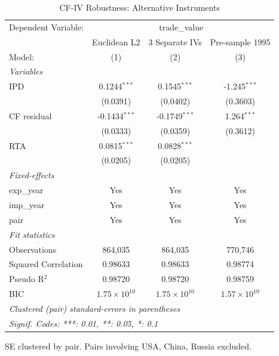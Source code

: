 
\begin{table}[htbp]
   \caption{CF-IV Robustness: Alternative Instruments}
   \centering
   \begin{tabular}{lccc}
      \tabularnewline \midrule \midrule
      Dependent Variable: & \multicolumn{3}{c}{trade\_value}\\
                          & Euclidean L2          & 3 Separate IVs        & Pre-sample 1995 \\   
      Model:              & (1)                   & (2)                   & (3)\\  
      \midrule
      \emph{Variables}\\
      IPD                 & 0.1244$^{***}$        & 0.1545$^{***}$        & -1.245$^{***}$\\   
                          & (0.0391)              & (0.0402)              & (0.3603)\\   
      CF residual         & -0.1434$^{***}$       & -0.1749$^{***}$       & 1.264$^{***}$\\   
                          & (0.0333)              & (0.0359)              & (0.3612)\\   
      RTA                 & 0.0815$^{***}$        & 0.0828$^{***}$        &   \\   
                          & (0.0205)              & (0.0205)              &   \\   
      \midrule
      \emph{Fixed-effects}\\
      exp\_year           & Yes                   & Yes                   & Yes\\  
      imp\_year           & Yes                   & Yes                   & Yes\\  
      pair                & Yes                   & Yes                   & Yes\\  
      \midrule
      \emph{Fit statistics}\\
      Observations        & 864,035               & 864,035               & 770,746\\  
      Squared Correlation & 0.98633               & 0.98633               & 0.98774\\  
      Pseudo R$^2$        & 0.98720               & 0.98720               & 0.98759\\  
      BIC                 & $1.75\times 10^{10}$  & $1.75\times 10^{10}$  & $1.57\times 10^{10}$\\   
      \midrule \midrule
      \multicolumn{4}{l}{\emph{Clustered (pair) standard-errors in parentheses}}\\
      \multicolumn{4}{l}{\emph{Signif. Codes: ***: 0.01, **: 0.05, *: 0.1}}\\
   \end{tabular}
   
   \par \raggedright 
   SE clustered by pair. Pairs involving USA, China, Russia excluded.
\end{table}


